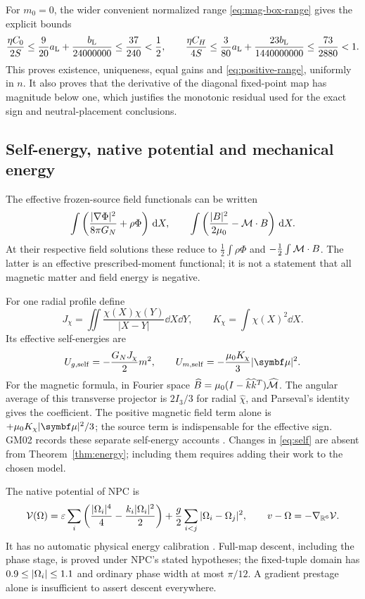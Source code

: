 For \(m_0=0\), the wider convenient normalized range \eqref{eq:mag-box-range} gives the explicit bounds
\begin{equation}
 \frac{\eta C_0}{2S}
 \le \frac9{20}a_{\rm L}+\frac{b_{\rm L}}{24000000}
 \le\frac{37}{240}<\frac12,\qquad
 \frac{\eta C_H}{4S}
 \le\frac3{80}a_{\rm L}+\frac{23b_{\rm L}}{1440000000}
 \le\frac{73}{2880}<1.
 \label{eq:fourier-certificate}
\end{equation}
This proves existence, uniqueness, equal gains and \eqref{eq:positive-range}, uniformly in \(n\). It also proves that the derivative of the diagonal fixed-point map has magnitude below one, which justifies the monotonic residual used for the exact sign and neutral-placement conclusions.

\subsection{Self-energy, native potential and mechanical energy}\label{app:accounts}
The effective frozen-source field functionals can be written
\[
 \int\left(\frac{|\nabla\Phi|^2}{8\pi G_N}+\rho\Phi\right)\,\mathrm d X,
 \qquad
 \int\left(\frac{|B|^2}{2\mu_0}-\mathcal M\cdot B\right)\,\mathrm d X.
\]
At their respective field solutions these reduce to
\(\frac12\int\rho\Phi\) and \(-\frac12\int\mathcal M\cdot B\). The latter is an effective prescribed-moment functional; it is not a statement that all magnetic matter and field energy is negative.

For one radial profile define
\[
 J_\chi=\iint\frac{\chi(X)\chi(Y)}{|X-Y|}\dd X\dd Y,\qquad
 K_\chi=\int\chi(X)^2\dd X.
\]
Its effective self-energies are
\begin{equation}
 U_{g,\rm self}=-\frac{G_NJ_\chi}{2}m^2,\qquad
 U_{m,\rm self}=-\frac{\mu_0K_\chi}{3}|\mub|^2.
 \label{eq:self}
\end{equation}
For the magnetic formula, in Fourier space
\(\widehat B=\mu_0(I-\widehat k\widehat k^T)\widehat{\mathcal M}\).
The angular average of this transverse projector is \(2I_3/3\) for radial \(\widehat\chi\), and Parseval's identity gives the coefficient. The positive magnetic field term alone is \(+\mu_0K_\chi|\mub|^2/3\); the source term is indispensable for the effective sign. GM02 records these separate self-energy accounts \cite{GM02}. Changes in \eqref{eq:self} are absent from Theorem~\ref{thm:energy}; including them requires adding their work to the chosen model.

The native potential of NPC is
\begin{equation}
 \mathcal V(\Omega)=\varepsilon\sum_i\left(\frac{|\Omega_i|^4}{4}
                  -\frac{k_i|\Omega_i|^2}{2}\right)
              +\frac g2\sum_{i<j}|\Omega_i-\Omega_j|^2,
 \qquad v-\Omega=-\nabla_{\mathbb R^6}\mathcal V. \label{eq:native-V}
\end{equation}
It has no automatic physical energy calibration \cite{NPC}. Full-map descent, including the phase stage, is proved under NPC's stated hypotheses; the fixed-tuple domain has \(0.9\le|\Omega_i|\le1.1\) and ordinary phase width at most \(\pi/12\). A gradient prestage alone is insufficient to assert descent everywhere.


